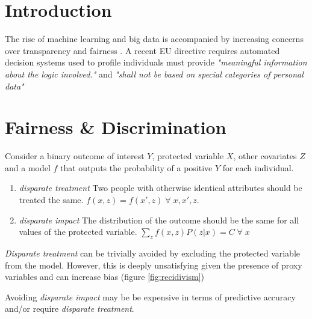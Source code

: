 \documentclass[a3,portrait,14pt]{sciposter}
\begin{document}
\begin{multicols}{2} %




\section*{Introduction}

The rise of machine learning and big data is accompanied by increasing concerns over transparency and fairness \cite{Barocas2014}. A recent EU directive requires automated decision systems used to profile individuals must provide \textit{"meaningful information about the logic involved."}  and \textit{"shall not be based on special categories of personal data"} \cite{Goodman2016}

\section*{Fairness \& Discrimination}
Consider a binary outcome of interest $Y$, protected variable $X$, other covariates $Z$ and a model $f$ that outputs the probability of a positive $Y$ for each individual.    
\begin{enumerate}
\item \textit{disparate treatment} Two people with otherwise identical attributes should be treated the same. $f(x,z) = f(x',z) \; \forall \; x,x',z$. 
\item \textit{disparate impact} The distribution of the outcome should be the same for all values of the protected variable. $\sum_z f(x,z)P(z|x) = C \; \forall \; x$
\end{enumerate}

\textit{Disparate treatment} can be trivially avoided by excluding the protected variable from the model. However, this is deeply unsatisfying given the presence of proxy variables and can increase bias (figure \ref{fig:recidivism})

Avoiding \textit{disparate impact} may be be expensive in terms of predictive accuracy and/or require \textit{disparate treatment}. 


\end{multicols}
\end{document}
